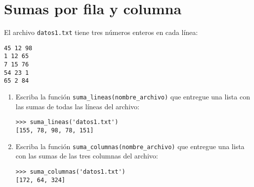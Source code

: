 \section{Sumas por fila y columna}

El archivo \lstinline!datos1.txt! tiene tres números enteros en cada
línea:
\begin{lstlisting}[language=file]
45 12 98
1 12 65
7 15 76
54 23 1
65 2 84
\end{lstlisting}

\begin{enumerate}

\item
  Escriba la función \lstinline!suma_lineas(nombre_archivo)! que
  entregue una lista con las sumas de todas las líneas del archivo:
\begin{lstlisting}
>>> suma_lineas('datos1.txt')
[155, 78, 98, 78, 151]
\end{lstlisting}

\item
  Escriba la función \lstinline!suma_columnas(nombre_archivo)! que
  entregue una lista con las sumas de las tres columnas del archivo:
\begin{lstlisting}
>>> suma_columnas('datos1.txt')
[172, 64, 324]
\end{lstlisting}

\end{enumerate}
